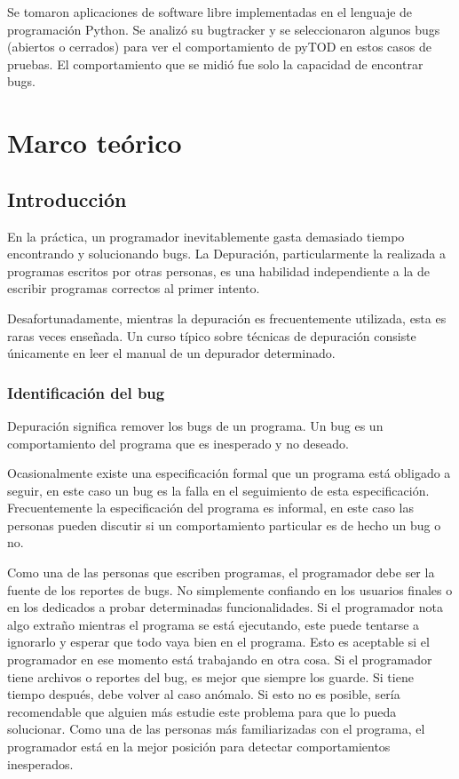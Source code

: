 \documentclass[12pt,legalpaper]{report}
\begin{document}
 Se tomaron aplicaciones de software libre implementadas en el lenguaje de programación Python.  Se analizó su bugtracker y se seleccionaron algunos bugs (abiertos o cerrados) para ver el comportamiento de pyTOD en estos casos de pruebas.  El comportamiento que se midió fue solo la capacidad de encontrar bugs.


\chapter{Marco teórico}
	\section{Introducción}

En la práctica, un programador inevitablemente gasta demasiado tiempo encontrando y solucionando bugs. La Depuración, particularmente la realizada a programas escritos por otras personas, es una habilidad independiente a la de escribir programas correctos al primer intento.

Desafortunadamente, mientras la depuración es frecuentemente utilizada, esta es raras veces enseñada. Un curso típico sobre técnicas de depuración consiste únicamente en leer el manual de un depurador determinado.

\subsection{Identificación del bug}

Depuración significa remover los bugs de un programa.  Un bug es un comportamiento del programa que es inesperado y no deseado.

Ocasionalmente existe una especificación formal que un programa está obligado a seguir, en este caso un bug es la falla en el seguimiento de esta especificación.  Frecuentemente la especificación del programa es informal, en este caso las personas pueden discutir si un comportamiento particular es de hecho un bug o no.

Como una de las personas que escriben programas, el programador debe ser la fuente de los reportes de bugs.  No simplemente confiando en los usuarios finales o en los dedicados a probar determinadas funcionalidades.  Si el programador nota algo extraño mientras el programa se está ejecutando, este puede tentarse a ignorarlo y esperar que todo vaya bien en el programa.  Esto es aceptable si el programador en ese momento está trabajando en otra cosa.  Si el programador tiene archivos o reportes del bug, es mejor que siempre los guarde.  Si tiene tiempo después, debe volver al caso anómalo.  Si esto no es posible, sería recomendable que alguien más estudie este problema para que lo pueda solucionar.  Como una de las personas más familiarizadas con el programa, el programador está en la mejor posición para detectar comportamientos inesperados.
\end{document}
